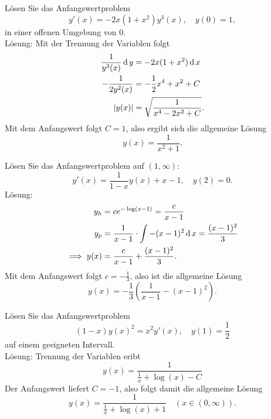 Lösen Sie das Anfangswertproblem
\begin{displaymath}
  y'(x) = -2x(1 + x^2)y^3(x), \quad y(0) = 1,
\end{displaymath}
in einer offenen Umgebung von $0$.\\
Lösung:
Mit der Trennung der Variablen folgt
\begin{align*}
  \frac{1}{y^3(x)} \operatorname{\mathop{}\!\mathrm{d}} y &= -2x(1 + x^2) \operatorname{\mathop{}\!\mathrm{d}} x\\
  -\frac{1}{2y^2(x)} &= -\frac{1}{2} x^4 + x^2 + C\\
  |y(x)| &= \sqrt{\frac{1}{x^4 - 2x^2 + C}}.
\end{align*}
Mit dem Anfangswert folgt $C = 1$, also ergibt sich die allgemeine Lösung
\begin{displaymath}
  y(x) = \frac{1}{x^2 + 1}.
\end{displaymath}

Lösen Sie das Anfangswertproblem auf $(1, \infty)$:
\begin{displaymath}
  y'(x) = \frac{1}{1 - x} y(x) + x - 1, \quad y(2) = 0.
\end{displaymath}
Lösung:
\begin{align*}
  y_h &= ce^{- \log(x - 1)} = \frac{c}{x - 1}\\
  y_p &= \frac{1}{x - 1} \cdot \int -(x - 1)^2 \operatorname{\mathop{}\!\mathrm{d}} x = \frac{(x - 1)^2}{3}\\
  \implies y(x) &= \frac{c}{x - 1} + \frac{(x-1)^2}{3}.
\end{align*}
Mit dem Anfangswert folgt $c = -\frac{1}{3}$, also ist die allgemeine Lösung
\begin{displaymath}
  y(x) = -\frac{1}{3}\left(\frac{1}{x - 1} - (x - 1)^2\right).
\end{displaymath}

Lösen Sie das Anfangswertproblem
\begin{displaymath}
  (1 - x)y(x)^2 = x^2 y'(x), \quad y(1) = \frac{1}{2}
\end{displaymath}
auf einem geeigneten Intervall.\\
Lösung: Trennung der Variablen eribt
\begin{displaymath}
  y(x) = \frac{1}{\frac{1}{x} + \log(x) - C}
\end{displaymath}
Der Anfangswert liefert $C = -1$, also folgt damit die allgemeine Lösung
\begin{displaymath}
  y(x) = \frac{1}{\frac{1}{x} + \log(x) + 1} \quad (x \in (0, \infty)).
\end{displaymath}

